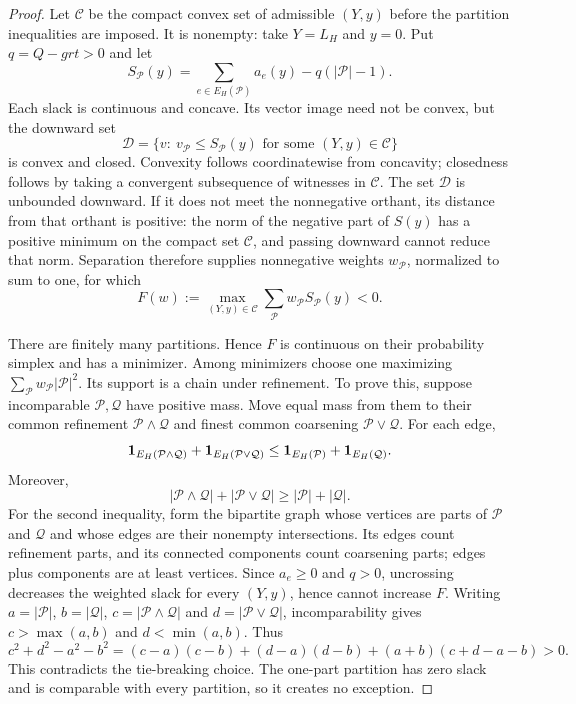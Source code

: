 \begin{proof}
Let $\mathcal C$ be the compact convex set of admissible $(Y,y)$ before
the partition inequalities are imposed. It is nonempty: take $Y=L_H$
and $y=0$. Put $q=Q-grt>0$ and let
\[
 S_{\mathcal P}(y)=\sum_{e\in E_H(\mathcal P)}a_e(y)
                         -q(|\mathcal P|-1).
\]
Each slack is continuous and concave. Its vector image need not be
convex, but the downward set
\[
 \mathcal D=\{v:\ v_{\mathcal P}\le S_{\mathcal P}(y)
                 \text{ for some }(Y,y)\in\mathcal C\}
\]
is convex and closed. Convexity follows coordinatewise from concavity;
closedness follows by taking a convergent subsequence of witnesses in
$\mathcal C$. The set $\mathcal D$ is unbounded downward. If it does not
meet the nonnegative orthant, its distance from that orthant is positive:
the norm of the negative part of $S(y)$ has a positive minimum on the
compact set $\mathcal C$, and passing downward cannot reduce that norm.
Separation therefore supplies nonnegative weights $w_{\mathcal P}$,
normalized to sum to one, for which
\begin{equation}
 F(w):=\max_{(Y,y)\in\mathcal C}
                \sum_{\mathcal P}w_{\mathcal P}S_{\mathcal P}(y)<0.
 \label{eq:ta-separated}
\end{equation}

There are finitely many partitions. Hence $F$ is continuous on their
probability simplex and has a minimizer. Among minimizers choose one
maximizing $\sum_{\mathcal P}w_{\mathcal P}|\mathcal P|^2$.
Its support is a chain under refinement. To prove this, suppose
incomparable $\mathcal P,\mathcal Q$ have positive mass. Move equal mass
from them to their common refinement $\mathcal P\wedge\mathcal Q$ and
finest common coarsening $\mathcal P\vee\mathcal Q$. For each edge,
\[
 \mathbf 1_{E_H(\mathcal P\wedge\mathcal Q)}+
 \mathbf 1_{E_H(\mathcal P\vee\mathcal Q)}
 \le \mathbf 1_{E_H(\mathcal P)}+\mathbf 1_{E_H(\mathcal Q)}.
\]
Moreover,
\[
 |\mathcal P\wedge\mathcal Q|+|\mathcal P\vee\mathcal Q|
       \ge |\mathcal P|+|\mathcal Q|.
\]
For the second inequality, form the bipartite graph whose vertices are
parts of $\mathcal P$ and $\mathcal Q$ and whose edges are their nonempty
intersections. Its edges count refinement parts, and its connected
components count coarsening parts; edges plus components are at least
vertices. Since $a_e\ge0$ and $q>0$, uncrossing decreases the weighted
slack for every $(Y,y)$, hence cannot increase $F$.
Writing $a=|\mathcal P|$, $b=|\mathcal Q|$, $c=|\mathcal P\wedge\mathcal Q|$
and $d=|\mathcal P\vee\mathcal Q|$, incomparability gives
$c>\max(a,b)$ and $d<\min(a,b)$. Thus
\[
 c^2+d^2-a^2-b^2
 =(c-a)(c-b)+(d-a)(d-b)+(a+b)(c+d-a-b)>0.
\]
This contradicts the tie-breaking choice. The one-part partition has
zero slack and is comparable with every partition, so it creates no
exception.


\end{proof}

